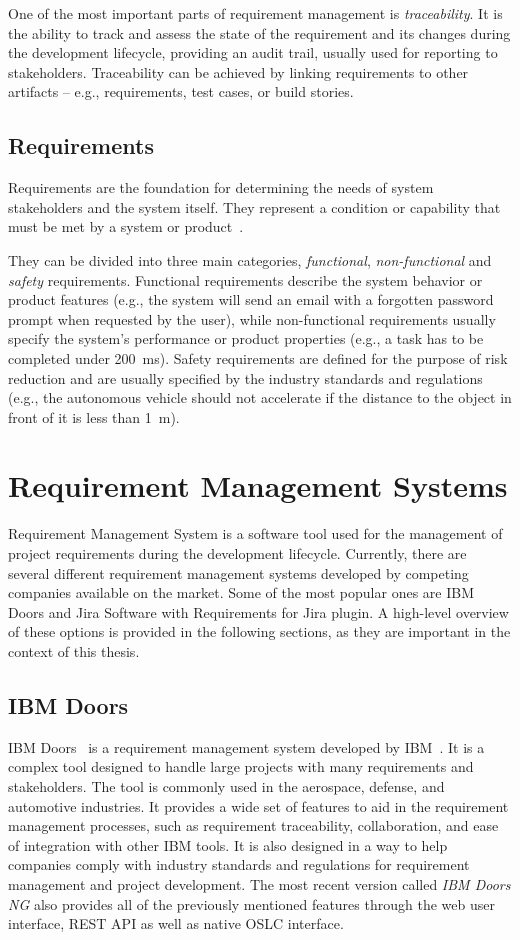 One of the most important parts of requirement management is \emph{traceability}. It is the ability to track and assess the state of the requirement and its changes during the development lifecycle, providing an audit trail, usually used for reporting to stakeholders. Traceability can be achieved by linking requirements to other artifacts -- e.g., requirements, test cases, or build stories.

\subsection*{Requirements}
\label{sec:requirements}
Requirements are the foundation for determining the needs of system stakeholders and the system itself. They represent a condition or capability
that must be met by a system or product \cite{IEEE_24765-2017}.

They can be divided into three main categories, \emph{functional}, \emph{non-functional} and \emph{safety} requirements. Functional requirements describe the system behavior or product features (e.g., the system will send an email with a forgotten password prompt when requested by the user), while non-functional requirements usually specify the system's performance or product properties (e.g., a task has to be completed under 200 ms). Safety requirements are defined for the purpose of risk reduction and are usually specified by the industry standards and regulations (e.g., the autonomous vehicle should not accelerate if the distance to the object in front of it is less than 1 m).

\section{Requirement Management Systems}
Requirement Management System is a software tool used for the management of project requirements during the development lifecycle. Currently, there are several different requirement management systems developed by competing companies available on the market. Some of the most popular ones are IBM Doors and Jira Software with Requirements for Jira plugin. A high-level overview of these options is provided in the following sections, as they are important in the context of this thesis.

\subsection*{IBM Doors}
IBM Doors \cite{ibm_doors} is a requirement management system developed by IBM \cite{ibm}. It is a complex tool designed to handle large projects with many requirements and stakeholders. The tool is commonly used in the aerospace, defense, and automotive industries. It provides a wide set of features to aid in the requirement management processes, such as requirement traceability, collaboration, and ease of integration with other IBM tools. It is also designed in a way to help companies comply with industry standards and regulations for requirement management and project development. The most recent version called \emph{IBM Doors NG} also provides all of the previously mentioned features through the web user interface, REST API as well as native OSLC interface.


